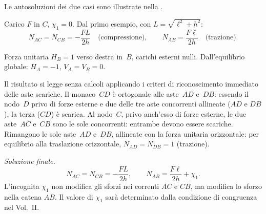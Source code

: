 \begin{esempio}
\begin{svolgimento}
		Le autosoluzioni dei due casi sono illustrate nella
		.
		
		Carico $F$ in $C$, $\chi_1 = 0$.
		Dal primo esempio, con $L = \sqrt{\ell^2 + h^2}$:
		\[
		N_{AC} = N_{CB} = -\frac{FL}{2h}
		\quad\text{(compressione)},
		\qquad
		N_{AB} = \frac{F\ell}{2h}
		\quad\text{(trazione)}.
		\]
		
		Forza unitaria $H_B = 1$ verso destra in~$B$,
		carichi esterni nulli.
		Dall'equilibrio globale: $H_A = -1$, $V_A = V_B = 0$.
		
		Il risultato si legge senza calcoli applicando i criteri
		di riconoscimento immediato delle aste scariche.
		Il monaco~$CD$ è ortogonale alle aste~$AD$ e~$DB$:
		essendo il nodo~$D$ privo di forze esterne e due delle
		tre aste concorrenti allineate ($AD$ e $DB$), la terza
		($CD$) è scarica. Al nodo~$C$, privo anch'esso di
		forze esterne, le due aste~$AC$ e~$CB$ sono le sole
		concorrenti: entrambe devono essere scariche.
		Rimangono le sole aste~$AD$ e~$DB$, allineate con la
		forza unitaria orizzontale: per equilibrio alla
		traslazione orizzontale, $N_{AD} = N_{DB} = 1$
		(trazione).
		
		\smallskip
		\noindent\textit{Soluzione finale.}
		\[
		N_{AC} = N_{CB} = -\frac{FL}{2h},
		\qquad
		N_{AB} = \frac{F\ell}{2h} + \chi_1.
		\]
		L'incognita $\chi_1$ non modifica gli sforzi
		nei correnti $AC$ e $CB$, ma modifica lo sforzo
		nella catena $AB$. Il valore di $\chi_1$
		sarà determinato dalla condizione di congruenza
		nel Vol.~II.
		
		
		\begin{figure}
\end{figure}
\end{svolgimento}
\end{esempio}
